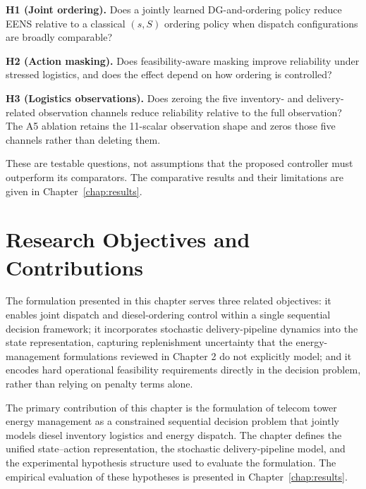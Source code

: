 \begin{revisedblock}
\textbf{H1 (Joint ordering).} Does a jointly learned
DG-and-ordering policy reduce EENS relative to a classical
$(s,S)$ ordering policy when dispatch configurations are
broadly comparable?

\textbf{H2 (Action masking).} Does feasibility-aware masking
improve reliability under stressed logistics, and does the
effect depend on how ordering is controlled?

\textbf{H3 (Logistics observations).} Does zeroing the five
inventory- and delivery-related observation channels reduce
reliability relative to the full observation? The A5 ablation
retains the 11-scalar observation shape and zeros those five
channels rather than deleting them.

These are testable questions, not assumptions that the
proposed controller must outperform its comparators.
The comparative results and their limitations are given in
Chapter~\ref{chap:results}.
\end{revisedblock}


\section{Research Objectives and Contributions}
\label{sec:objectives}

The formulation presented in this chapter serves three related objectives:
it enables joint dispatch and diesel-ordering control within a single
sequential decision framework; it incorporates stochastic delivery-pipeline
dynamics into the state representation, capturing replenishment uncertainty
that the energy-management formulations reviewed in Chapter 2 do not explicitly model; and it encodes
hard operational feasibility requirements directly in the decision problem,
rather than relying on penalty terms alone.

The primary contribution of this chapter is the formulation of telecom tower
energy management as a constrained sequential decision problem that jointly
models diesel inventory logistics and energy dispatch. The chapter defines the
unified state--action representation, the stochastic delivery-pipeline model,
and the experimental hypothesis structure used to evaluate the formulation.
The empirical evaluation of these hypotheses is presented in
Chapter~\ref{chap:results}.

